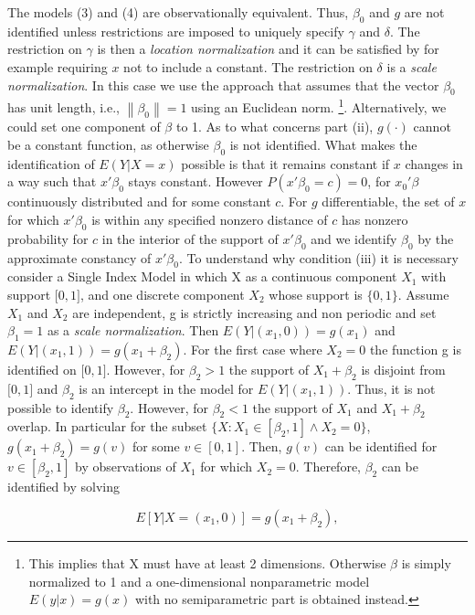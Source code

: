 \documentclass[a4paper]{article}
\newcommand{\norm}[1]{\left\lVert#1\right\rVert}
\begin{document}
The models (3) and (4) are observationally equivalent. Thus, $\beta_0$ and $g$ are not identified unless restrictions are imposed to uniquely specify $\gamma$ and $\delta$. The restriction on $\gamma$ is then a \textit{location normalization} and it can be satisfied by for example requiring $x$ not to include a constant. The restriction on $\delta$ is a \textit{scale normalization}. In this case we use the approach that assumes that the vector $\beta_0$ has unit length, i.e., $\norm{ \beta_0 } = 1$ using an Euclidean norm. \footnote{This implies that X must have at least 2 dimensions. Otherwise $\beta$ is simply normalized to 1 and a one-dimensional nonparametric model $E(y|x) = g(x)$ with no semiparametric part is obtained instead.}. Alternatively, we could set one component of $\beta$ to 1. %
As to what concerns part (ii), $g(\cdot)$ cannot be a constant function, as otherwise $\beta_0$ is not identified. What makes the identification of $E(Y|X = x)$ possible is that it remains constant if $x$ changes in a way such that $x'\beta_0$ stays constant. However $P(x'\beta_0 = c)=0$, for $x_0'\beta$ continuously distributed and for some constant $c$. For $g$ differentiable, the set of $x$ for which $x'\beta_0$ is within any specified nonzero distance of $c$ has nonzero probability for $c$ in the interior of the support of $x'\beta_0$ and we identify $\beta_0$ by the approximate constancy of $x'\beta_0$.
To understand why condition (iii) it is necessary consider a Single Index Model in which X as a continuous component $X_1$ with support $\big[0,1\big]$, and one discrete component $X_2$ whose support is $\{0,1\}$. Assume $X_1$ and $X_2$ are independent, g is strictly increasing and non periodic and set $\beta_1 = 1$ as a \textit{scale normalization}. Then $E(Y|(x_1,0)) = g(x_1)$ and $E(Y|(x_1,1)) = g(x_1 + \beta_2)$. For the first case where $X_2 = 0$ the function g is identified on $\big[0,1\big]$. However, for $\beta_2 > 1$ the support of $ X_1 + \beta_2$ is disjoint from $\big[0,1\big]$ and $\beta_2$ is an intercept in the model for $E(Y|(x_1,1))$. Thus, it is not possible to identify $\beta_2$. However, for $\beta_2 < 1$ the support of $X_1$ and $X_1 + \beta_2$ overlap. In particular for the subset $\{X: X_1 \in [ \beta_2, 1] \wedge X_2 = 0\}$, $g(x_1 + \beta_2) = g(v)$ for some $v \in [0,1]$. Then, $g(v)$ can be identified for $v \in [\beta_2, 1]$ by observations of $X_1$ for which $X_2 = 0$. Therefore, $\beta_2$ can be identified by solving

\begin{equation}
E[Y| X = (x_1,0)] = g(x_1 + \beta_2),
\end{equation}
\end{document}

